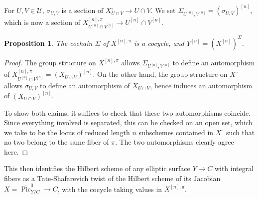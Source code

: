 \documentclass{amsart}
\theoremstyle{plain}
\newtheorem{proposition}[theorem]{Proposition}
\theoremstyle{definition}
\theoremstyle{remark}
\begin{document}
    For $U,V\in\mathcal U$, $\sigma_{U,V}$ is a section of $X_{U\cap V}^\circ\to U\cap V$.
    We set $\Sigma_{U^{[n]}, V^{[n]}}=(\sigma_{U,V})^{[n]}$, which is now a section of $X^{[n],\pi}_{U^{[n]}\cap V^{[n]}}\to U^{[n]}\cap V^{[n]}$.
    \begin{proposition}
        The cochain $\Sigma$ of $X^{[n],\pi}$ is a cocycle, and $Y^{[n]}=(X^{[n]})^{\Sigma}$.
    \end{proposition}
    \begin{proof}
        The group structure on $X^{[n],\pi}$ allows $\Sigma_{U^{[n]}, V^{[n]}}$ to define an automorphism of $X^{[n],\pi}_{U^{[n]}\cap V^{[n]}}=(X_{U\cap V})^{[n]}$.
        On the other hand, the group structure on $X^\circ$ allows $\sigma_{U,V}$ to define an automorphism of $X_{U\cap V}$, hence induces an automorphism of $(X_{U\cap V})^{[n]}$.

        To show both claims, it suffices to check that these two automorphisms coincide.
        Since everything involved is separated, this can be checked on an open set, which we take to be the locus of reduced length $n$ subschemes contained in $X^\circ$ such that no two belong to the same fiber of $\pi$.
        The two automorphisms clearly agree here.
    \end{proof}
    This then identifies the Hilbert scheme of any elliptic surface $Y\to C$ with integral fibers as a Tate-Shafarevich twist of the Hilbert scheme of its Jacobian $X=\overline{\operatorname{Pic}}_{Y/C}^0\to C$, with the cocycle taking values in $X^{[n],\pi}$.
\end{document}
